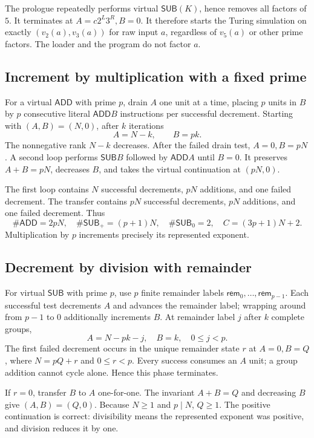 \documentclass[11pt,letterpaper]{article}
\theoremstyle{definition}
\theoremstyle{remark}
\newcommand{\ADD}{\mathsf{ADD}}
\newcommand{\SUB}{\mathsf{SUB}}
\begin{document}
The prologue repeatedly performs virtual $\SUB(K)$, hence removes all factors of $5$. It terminates at $A=c2^L3^R,B=0$. It therefore starts the Turing simulation on exactly $(v_2(a),v_3(a))$ for raw input $a$, regardless of $v_5(a)$ or other prime factors. The loader and the program do not factor $a$.

\subsection{Increment by multiplication with a fixed prime}
For a virtual $\ADD$ with prime $p$, drain $A$ one unit at a time, placing $p$ units in $B$ by $p$ consecutive literal $\ADD B$ instructions per successful decrement. Starting with $(A,B)=(N,0)$, after $k$ iterations
\[
 A=N-k,\qquad B=pk.
\]
The nonnegative rank $N-k$ decreases. After the failed drain test, $A=0,B=pN$. A second loop performs $\SUB B$ followed by $\ADD A$ until $B=0$. It preserves $A+B=pN$, decreases $B$, and takes the virtual continuation at $(pN,0)$.

The first loop contains $N$ successful decrements, $pN$ additions, and one failed decrement. The transfer contains $pN$ successful decrements, $pN$ additions, and one failed decrement. Thus
\begin{equation}\label{qoc:um:eq:addcost}
 \#\ADD=2pN,\quad \#\SUB_+=(p+1)N,\quad
 \#\SUB_0=2,\quad C=(3p+1)N+2.
\end{equation}
Multiplication by $p$ increments precisely its represented exponent.

\subsection{Decrement by division with remainder}
For virtual $\SUB$ with prime $p$, use $p$ finite remainder labels $\mathsf{rem}_0,\ldots,\mathsf{rem}_{p-1}$. Each successful test decrements $A$ and advances the remainder label; wrapping around from $p-1$ to $0$ additionally increments $B$. At remainder label $j$ after $k$ complete groups,
\[
 A=N-pk-j,\quad B=k,\quad 0\leq j<p.
\]
The first failed decrement occurs in the unique remainder state $r$ at $A=0,B=Q$, where $N=pQ+r$ and $0\leq r<p$. Every success consumes an $A$ unit; a group addition cannot cycle alone. Hence this phase terminates.

If $r=0$, transfer $B$ to $A$ one-for-one. The invariant $A+B=Q$ and decreasing $B$ give $(A,B)=(Q,0)$. Because $N\geq1$ and $p\mid N$, $Q\geq1$. The positive continuation is correct: divisibility means the represented exponent was positive, and division reduces it by one.
\end{document}
